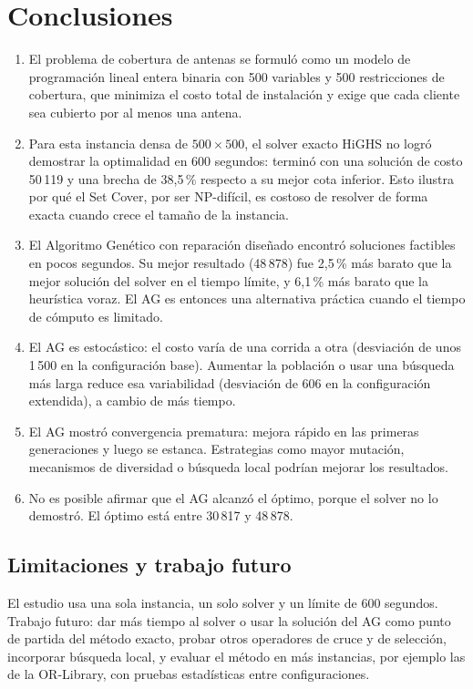 \section{Conclusiones}

\begin{enumerate}
\item El problema de cobertura de antenas se formuló como un modelo de programación lineal entera binaria con 500 variables y 500 restricciones de cobertura, que minimiza el costo total de instalación y exige que cada cliente sea cubierto por al menos una antena.
\item Para esta instancia densa de $500\times500$, el solver exacto HiGHS no logró demostrar la optimalidad en 600 segundos: terminó con una solución de costo 50\,119 y una brecha de 38,5\,\% respecto a su mejor cota inferior. Esto ilustra por qué el Set Cover, por ser NP-difícil, es costoso de resolver de forma exacta cuando crece el tamaño de la instancia.
\item El Algoritmo Genético con reparación diseñado encontró soluciones factibles en pocos segundos. Su mejor resultado (48\,878) fue 2,5\,\% más barato que la mejor solución del solver en el tiempo límite, y 6,1\,\% más barato que la heurística voraz. El AG es entonces una alternativa práctica cuando el tiempo de cómputo es limitado.
\item El AG es estocástico: el costo varía de una corrida a otra (desviación de unos 1\,500 en la configuración base). Aumentar la población o usar una búsqueda más larga reduce esa variabilidad (desviación de 606 en la configuración extendida), a cambio de más tiempo.
\item El AG mostró convergencia prematura: mejora rápido en las primeras generaciones y luego se estanca. Estrategias como mayor mutación, mecanismos de diversidad o búsqueda local podrían mejorar los resultados.
\item No es posible afirmar que el AG alcanzó el óptimo, porque el solver no lo demostró. El óptimo está entre 30\,817 y 48\,878.
\end{enumerate}

\subsection*{Limitaciones y trabajo futuro}
El estudio usa una sola instancia, un solo solver y un límite de 600 segundos. Trabajo futuro: dar más tiempo al solver o usar la solución del AG como punto de partida del método exacto, probar otros operadores de cruce y de selección, incorporar búsqueda local, y evaluar el método en más instancias, por ejemplo las de la OR-Library, con pruebas estadísticas entre configuraciones.

